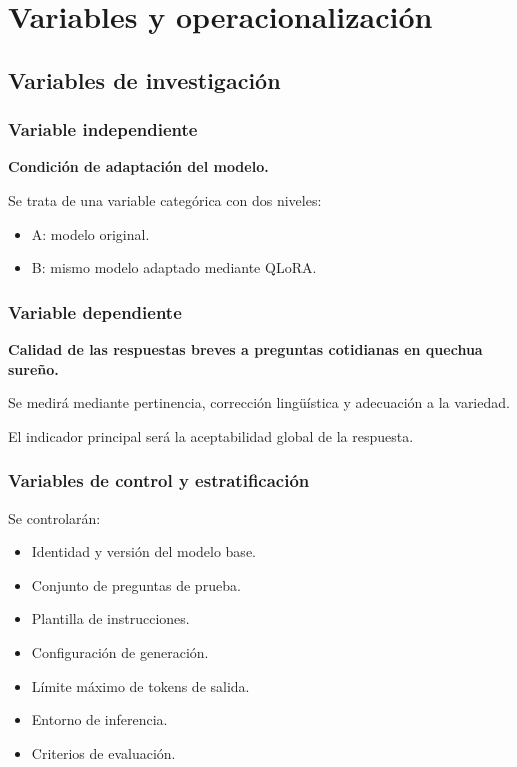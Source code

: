 \section{Variables y operacionalización}\label{variables-operacionalizacion}

\subsection{Variables de investigación}\label{variables-de-investigaciuxf3n}

\subsubsection{Variable independiente}\label{variable-independiente}

\textbf{Condición de adaptación del modelo.}

Se trata de una variable categórica con dos niveles:

\begin{itemize}
\tightlist
\item
  A: modelo original.
\item
  B: mismo modelo adaptado mediante QLoRA.
\end{itemize}

\subsubsection{Variable dependiente}\label{variable-dependiente}

\textbf{Calidad de las respuestas breves a preguntas cotidianas en quechua sureño.}

Se medirá mediante pertinencia, corrección lingüística y adecuación a la variedad.

El indicador principal será la aceptabilidad global de la respuesta.

\subsubsection{Variables de control y estratificación}\label{variables-de-control-y-estratificaciuxf3n}

Se controlarán:

\begin{itemize}
\tightlist
\item
  Identidad y versión del modelo base.
\item
  Conjunto de preguntas de prueba.
\item
  Plantilla de instrucciones.
\item
  Configuración de generación.
\item
  Límite máximo de tokens de salida.
\item
  Entorno de inferencia.
\item
  Criterios de evaluación.
\end{itemize}

